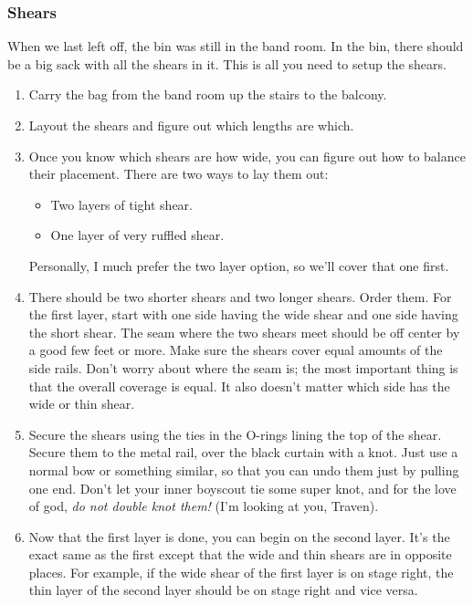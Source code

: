 \documentclass[letterpaper,10pt,oneside,headsepline]{scrreprt}
\begin{document}
\subsubsection{Shears}
When we last left off, the bin was still in the band room. In the bin, there should be a big sack with all the shears in it. This is all you need to setup the shears.
\begin{enumerate}
\item Carry the bag from the band room up the stairs to the balcony.
\item Layout the shears and figure out which lengths are which.
\item Once you know which shears are how wide, you can figure out how to balance their placement. There are two ways to lay them out: 
\begin{itemize}
\item Two layers of tight shear.
\item One layer of very ruffled shear. 
\end{itemize}

Personally, I much prefer the two layer option, so we'll cover that one first. 

\item There should be two shorter shears and two longer shears. Order them. For the first layer, start with one side having the wide shear and one side having the short shear. The seam where the two shears meet should be off center by a good few feet or more. Make sure the shears cover equal amounts of the side rails. Don't worry about where the seam is; the most important thing is that the overall coverage is equal. It also doesn't matter which side has the wide or thin shear.
\item Secure the shears using the ties in the O-rings lining the top of the shear. Secure them to the metal rail, over the black curtain with a knot. Just use a normal bow or something similar, so that you can undo them just by pulling one end. Don't let your inner boyscout tie some super knot, and for the love of god, \textit{do not double knot them!} (I'm looking at you, Traven).
\item Now that the first layer is done, you can begin on the second layer. It's the exact same as the first except that the wide and thin shears are in opposite places. For example, if the wide shear of the first layer is on stage right, the thin layer of the second layer should be on stage right and vice versa.  
\end{enumerate}
\end{document}
